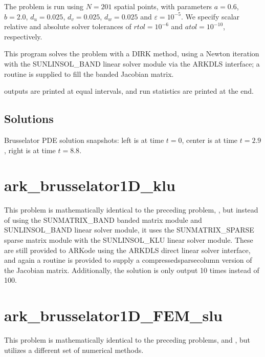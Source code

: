 \documentclass[letterpaper,10pt,english]{sphinxmanual}
\begin{document}
\sphinxAtStartPar
The problem is run using \(N=201\) spatial points, with parameters
\(a=0.6\), \(b=2.0\), \(d_u=0.025\), \(d_v=0.025\),
\(d_w=0.025\) and \(\varepsilon=10^{-5}\).  We specify scalar
relative and absolute solver tolerances of \(rtol=10^{-6}\) and
\(atol=10^{-10}\), respectively.

\sphinxAtStartPar
This program solves the problem with a DIRK method, using a Newton
iteration with the SUNLINSOL\_BAND linear solver module via the ARKDLS
interface; a routine is supplied to fill the banded Jacobian matrix.

 outputs are printed at equal intervals, and run statistics
are printed at the end.


\subsection{Solutions}
\label{\detokenize{c_serial:id20}}
\noindent{}

\noindent{}

\noindent{}

\sphinxAtStartPar
Brusselator PDE solution snapshots: left is at time \(t=0\),
center is at time \(t=2.9\), right is at time \(t=8.8\).


\section{ark\_brusselator1D\_klu}
\label{\detokenize{c_serial:ark-brusselator1d-klu}}\label{\detokenize{c_serial:id21}}
\sphinxAtStartPar
This problem is mathematically identical to the preceding problem,
{\hyperref[\detokenize{c_serial:ark-brusselator1d}]{}}, but instead of using the SUNMATRIX\_BAND
banded matrix module and SUNLINSOL\_BAND linear solver module, it uses
the SUNMATRIX\_SPARSE sparse matrix module with the SUNLINSOL\_KLU
linear solver module.  These are still provided to ARKode using the
ARKDLS direct linear solver interface, and again a routine is provided
to supply a compressed\sphinxhyphen{}sparse\sphinxhyphen{}column version of the Jacobian matrix.
Additionally, the solution is only output 10 times instead of 100.


\section{ark\_brusselator1D\_FEM\_slu}
\label{\detokenize{c_serial:ark-brusselator1d-fem-slu}}\label{\detokenize{c_serial:id22}}
\sphinxAtStartPar
This problem is mathematically identical to the preceding problems,
{\hyperref[\detokenize{c_serial:ark-brusselator1d}]{}} and {\hyperref[\detokenize{c_serial:ark-brusselator1d-klu}]{}}, but
utilizes a different set of numerical methods.
\end{document}
